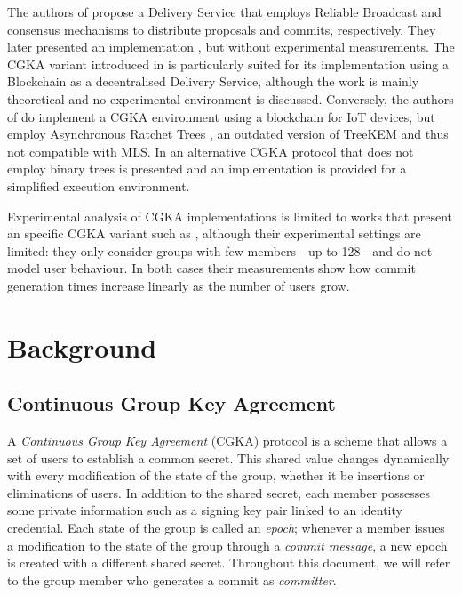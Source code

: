 \documentclass[preprint, 12pt]{elsarticle}
\begin{document}
The authors of \cite{discreet_original} propose a Delivery Service that employs Reliable Broadcast and consensus mechanisms to distribute proposals and commits, respectively. They later presented an implementation \cite{discreet}, but without experimental measurements. The CGKA variant introduced in \cite{decaf} is particularly suited for its implementation using a Blockchain as a decentralised Delivery Service, although the work is mainly theoretical and no experimental environment is discussed. Conversely, the authors of \cite{art_bc} do implement a CGKA environment using a blockchain for IoT devices, but employ Asynchronous Ratchet Trees \cite{art}, an outdated version of TreeKEM and thus not compatible with MLS. In \cite{dec_ack} an alternative CGKA protocol that does not employ binary trees is presented and an implementation is provided for a simplified execution environment. 

Experimental analysis of CGKA implementations is limited to works that present an specific CGKA variant such as \cite{a_cgka, dec_ack, treesync}, although their experimental settings are limited: they only consider groups with few members - up to 128 - and do not model user behaviour. In both cases their measurements show how commit generation times increase linearly as the number of users grow. 

\section{Background} 
\label{sec:background}

\subsection{Continuous Group Key Agreement}
\label{sec:cgka}

A \textit{Continuous Group Key Agreement} (CGKA) protocol is a scheme that allows a set of users to establish a common secret. This shared value changes dynamically with every modification of the state of the group, whether it be insertions or eliminations of users. In addition to the shared secret, each member possesses some private information such as a signing key pair linked to an identity credential. Each state of the group is called an \textit{epoch}; whenever a member issues a modification to the state of the group through a \textit{commit message}, a new epoch is created with a different shared secret. Throughout this document, we will refer to the group member who generates a commit as \textit{committer}.
\end{document}
